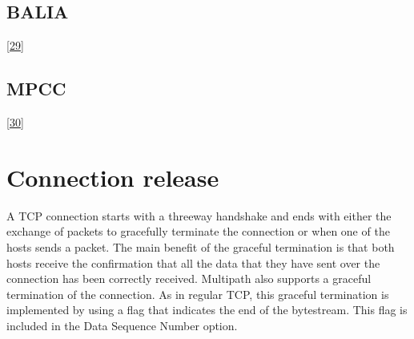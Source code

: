 \documentclass[letterpaper,10pt,english]{sphinxmanual}
\begin{document}
\subsection{BALIA}
\label{\detokenize{mptcp:balia}}
\sphinxAtStartPar
{[}\hyperlink{cite.biblio:id8993}{29}{]}


\subsection{MPCC}
\label{\detokenize{mptcp:mpcc}}
\sphinxAtStartPar
{[}\hyperlink{cite.biblio:id9002}{30}{]}


\section{Connection release}
\label{\detokenize{mptcp:connection-release}}\label{\detokenize{mptcp:mptcp-release}}
\sphinxAtStartPar
A TCP connection starts with a three\sphinxhyphen{}way handshake and ends with either the exchange of  packets to gracefully terminate the connection or when one of the hosts sends a  packet. The main benefit of the graceful termination is that both hosts receive the confirmation that all the data that they have sent over the connection has been correctly received. Multipath also supports a graceful termination of the connection. As in regular TCP, this graceful termination is implemented by using a flag that indicates the end of the bytestream. This flag is included in the Data Sequence Number option.
\end{document}
